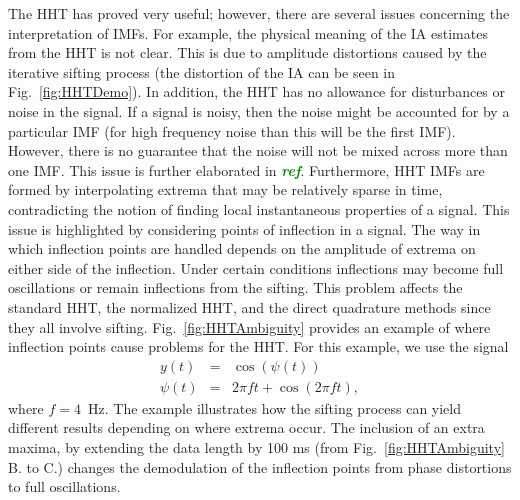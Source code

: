 \documentclass[journal,11pt,a4paper,onecolumn,draftcls]{IEEEtran}
\newcommand{\dean}[1]{\textsf{\emph{\textbf{\textcolor{green}{#1}}}}}
\begin{document}
The HHT has proved very useful; however, there are several issues concerning the interpretation of IMFs. For example, the physical meaning of the IA estimates from the HHT is not clear. This is due to amplitude distortions caused by the iterative sifting process (the distortion of the IA can be seen in Fig.~\ref{fig:HHTDemo}). In addition, the HHT has no allowance for disturbances or noise in the signal. If a signal is noisy, then the noise might be accounted for by a particular IMF (for high frequency noise than this will be the first IMF). However, there is no guarantee that the noise will not be mixed across more than one IMF. This issue is further elaborated in \dean{ref}. Furthermore, HHT IMFs are formed by interpolating extrema that may be relatively sparse in time, contradicting the notion of finding local instantaneous properties of a signal. This issue is highlighted by considering points of inflection in a signal. The way in which inflection points are handled depends on the amplitude of extrema on either side of the inflection. Under certain conditions inflections may become full oscillations or remain inflections from the sifting. This problem affects the standard HHT, the normalized HHT, and the direct quadrature methods since they all involve sifting. Fig.~\ref{fig:HHTAmbiguity} provides an example of where inflection points cause problems for the HHT. For this example, we use the signal 
\begin{eqnarray}\label{eq:HHTAmbiguityTestSig}
y\left( t \right) &=& \cos \left( \psi \left( t \right) \right) \\
\psi \left( t \right) &=& 2\pi ft + \cos \left( {2\pi ft} \right),
\end{eqnarray}
where $f=4$~Hz. The example illustrates how the sifting process can yield different results depending on where extrema occur. The inclusion of an extra maxima, by extending the data length by 100 ms (from Fig.~\ref{fig:HHTAmbiguity} B. to C.) changes the demodulation of the inflection points from phase distortions to full oscillations.
\end{document}

